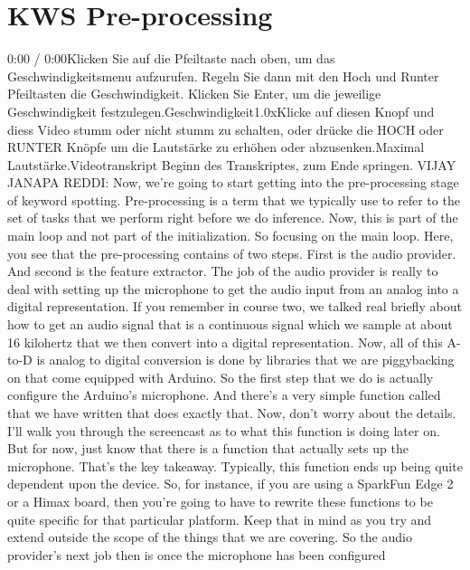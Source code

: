 \section{KWS Pre-processing}

    0:00 / 0:00Klicken Sie auf die Pfeiltaste nach oben, um das Geschwindigkeitsmenu aufzurufen. Regeln Sie dann mit den Hoch und Runter Pfeiltasten die Geschwindigkeit. Klicken Sie Enter, um die jeweilige Geschwindigkeit festzulegen.Geschwindigkeit1.0xKlicke auf diesen Knopf und diess Video stumm oder nicht stumm zu schalten, oder drücke die HOCH oder RUNTER Knöpfe um die Lautstärke zu erhöhen oder abzusenken.Maximal Lautstärke.Videotranskript
    Beginn des Transkriptes, zum Ende springen.
    VIJAY JANAPA REDDI: Now, we're going to start
    getting into the pre-processing stage of keyword spotting.
    Pre-processing is a term that we typically
    use to refer to the set of tasks that we perform right before we do inference.
    Now, this is part of the main loop and not part of the initialization.
    So focusing on the main loop.
    Here, you see that the pre-processing contains of two steps.
    First is the audio provider.
    And second is the feature extractor.
    The job of the audio provider is really to deal
    with setting up the microphone to get the audio input from an analog
    into a digital representation.
    If you remember in course two, we talked real briefly
    about how to get an audio signal that is a continuous signal which
    we sample at about 16 kilohertz that we then
    convert into a digital representation.
    Now, all of this A-to-D is analog to digital conversion
    is done by libraries that we are piggybacking
    on that come equipped with Arduino.
    So the first step that we do is actually configure the Arduino's microphone.
    And there's a very simple function called that we have written
    that does exactly that.
    Now, don't worry about the details.
    I'll walk you through the screencast as to what
    this function is doing later on.
    But for now, just know that there is a function that
    actually sets up the microphone.
    That's the key takeaway.
    Typically, this function ends up being quite dependent upon the device.
    So, for instance, if you are using a SparkFun Edge 2 or a Himax board,
    then you're going to have to rewrite these functions to be quite
    specific for that particular platform.
    Keep that in mind as you try and extend outside the scope of the things
    that we are covering.
    So the audio provider's next job then is once the microphone has been configured
